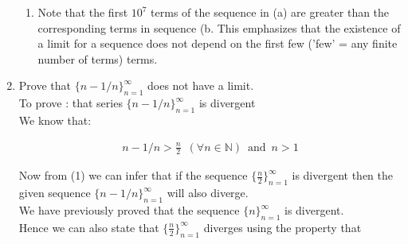 \documentclass[11pt, letterpaper]{article}
\begin{document}
\begin{enumerate}
{\begin{enumerate}
{			\setcounter{equation}{0}
			\begin{eqnarray}
				\left| \frac{n}{10^7} - L \right| < \epsilon \,\,\, \forall n \geq N
			\end{eqnarray}					
			
			\begin{center}
				Here L is the limit and N$>$0. N $\in \mathbb{I}$ and $\epsilon$ is an arbitrary positive rational number. 
			\end{center}
			Now as the limit exists we would be able to find some N for any arbitrary $\epsilon$ where equation (1) is satisfied.\\
				Let $\epsilon = 1$ 
				
			\begin{eqnarray}
				\left| \frac{n}{10^7} - L \right| < 1 \nonumber \\
				\frac{n}{10^7} \in (L-1, L+1) \nonumber \\
				n \in (10^7(L-1), 10^7(L+1))
			\end{eqnarray}
			
			For any Limit value L that we take, we can find a value for n where equation (2) is not satisfied.\\
			Hence our assumption that this function converges was wrong.\\
			The series $ \lbrace \frac{n}{10^7} \rbrace_{n=1}^\infty $ clearly diverges
		}
		\item{Note that the first $10^7$ terms of the sequence in (a) are greater than the corresponding terms in sequence (b. This emphasizes that the existence of a limit for a sequence does not depend on the first few ('few' = any finite number of terms) terms.}
	\end{enumerate} }
	
	\item{Prove that $\lbrace n-1/n \rbrace_{n=1}^\infty$ does not have a limit.\\
		To prove : that series $ \lbrace n - 1/n \rbrace_{n=1}^\infty $	is divergent\\
		We know that:
		
		\setcounter{equation}{0}
		
		\begin{eqnarray}
			n - 1/n > \frac{n}{2} \,\,\,(\forall n \in \mathbb{N}) \,\,\, \mathrm{and} \,\,\, n > 1
		\end{eqnarray}
		
		Now from (1) we can infer that if the sequence $ \lbrace \frac{n}{2} \rbrace_{n=1}^\infty $ is divergent then the given sequence $ \lbrace n-1/n \rbrace_{n=1}^\infty $ will also diverge.\\
		We have previously proved that the sequence $ \lbrace n \rbrace_{n=1}^\infty $ is divergent.\\
		Hence we can also state that $ \lbrace \frac{n}{2} \rbrace_{n=1}^\infty $ diverges using the property that\\
		
}
\end{enumerate}
\end{document}
